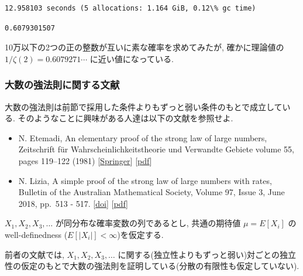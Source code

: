 \documentclass[10pt, a4paper,xelatex,ja=standard]{bxjsarticle}
\makeatletter
\newcommand{\boxspacing}{\kern\kvtcb@left@rule\kern\kvtcb@boxsep}
\newcommand{\prompt}[4]{
        \ttfamily\llap{{\color{#2}[#3]:\hspace{3pt}#4}}\vspace{-\baselineskip}
    }
\makeatother
\begin{document}
    \begin{Verbatim}[commandchars=\\\{\}]
 12.958103 seconds (5 allocations: 1.164 GiB, 0.12\% gc time)
    \end{Verbatim}

            \begin{tcolorbox}[breakable, size=fbox, boxrule=.5pt, pad at break*=1mm, opacityfill=0]
\prompt{Out}{outcolor}{10}{\boxspacing}
\begin{Verbatim}[commandchars=\\\{\}]
0.6079301507
\end{Verbatim}
\end{tcolorbox}
        
    10万以下の2つの正の整数が互いに素な確率を求めてみたが, 確かに理論値の
\(1/\zeta(2) = 0.6079271{\cdots}\) に近い値になっている.

    \hypertarget{ux5927ux6570ux306eux5f37ux6cd5ux5247ux306bux95a2ux3059ux308bux6587ux732e}{%
\subsubsection{大数の強法則に関する文献}\label{ux5927ux6570ux306eux5f37ux6cd5ux5247ux306bux95a2ux3059ux308bux6587ux732e}}

大数の強法則は前節で採用した条件よりもずっと弱い条件のもとで成立している.
そのようなことに興味がある人達は以下の文献を参照せよ.

\begin{itemize}
\item
  N. Etemadi, An elementary proof of the strong law of large numbers,
  Zeitschrift für Wahrscheinlichkeitstheorie und Verwandte Gebiete
  volume 55, pages 119--122 (1981)
  {[}\href{https://link.springer.com/article/10.1007/BF01013465\#citeas}{Springer}{]}
  {[}\href{https://people.math.umass.edu/~yaoli/ptrl.pdf}{pdf}{]}
\item
  N. Lizia, A simple proof of the strong law of large numbers with
  rates, Bulletin of the Australian Mathematical Society, Volume 97,
  Issue 3, June 2018, pp.~513 - 517.
  {[}\href{https://doi.org/10.1017/S0004972718000059}{doi}{]}
  {[}\href{http://www.im.ufrj.br/nuno/SLLN.pdf}{pdf}{]}
\end{itemize}

\(X_1,X_2,X_3,\ldots\) が同分布な確率変数の列であるとし, 共通の期待値
\(\mu=E[X_i]\) のwell-definedness (\(E[|X_i|]<\infty\))を仮定する.

前者の文献では, \(X_1,X_2,X_3,\ldots\)
に関する(独立性よりもずっと弱い)対ごとの独立性の仮定のもとで大数の強法則を証明している(分散の有限性も仮定していない).
\end{document}
